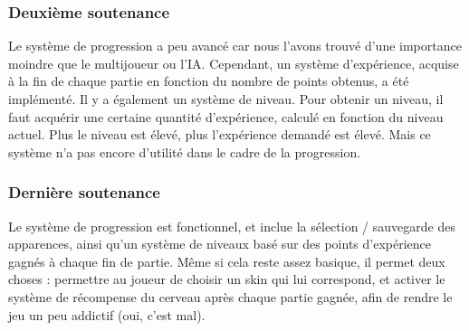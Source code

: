 	
	\subsubsection{Deuxième soutenance}


	Le système de progression a peu avancé car nous l'avons trouvé d'une importance moindre que le multijoueur ou l'IA.
	Cependant, un système d'expérience, acquise à la fin de chaque partie en fonction du nombre de
	points obtenus, a été implémenté. Il y a également un système de niveau. Pour obtenir un niveau, il faut
	acquérir une certaine quantité d'expérience, calculé en fonction du niveau actuel. Plus le niveau est élevé,
	plus l'expérience demandé est élevé. Mais ce système n'a pas encore d'utilité dans le cadre de la progression.

	\subsubsection{Dernière soutenance}


	Le système de progression est fonctionnel, et inclue la sélection / sauvegarde des apparences, ainsi qu'un système de niveaux basé sur des points d'expérience 
	gagnés à chaque fin de partie. Même si cela reste assez basique, il permet deux choses : permettre au joueur de choisir un skin qui lui correspond, et activer 
	le système de récompense du cerveau après chaque partie gagnée, afin de rendre le jeu un peu addictif (oui, c'est mal).

	